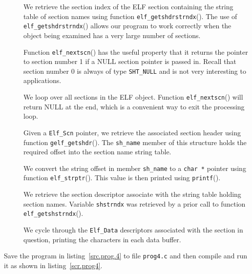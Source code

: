 \documentclass[a4paper]{book}
\makeatletter
\newcommand{\constant}[1]{\texttt{#1}}
\newcommand{\function}[1]{\texttt{#1}()}
\newcommand{\filename}[1]{\texttt{#1}}
\newcommand{\parameter}[1]{\texttt{#1}}
\newcommand{\type}[1]{\texttt{#1}}
\newenvironment{callout}[2][blue]{%
  \begingroup\newcommand{\@cocolor}{#1}%
  \newcommand{\@cogroup}[1]{#2}}{\endgroup}
\newcommand{\@co}[1]{\framebox{\textbf{\color{\@cocolor}#1}}}
\newcommand{\coref}[1]{%
  \hypertarget{\@cogroup.#1.cr}{%
    \hyperlink{\@cogroup.#1.co}{\@co{#1}}}}
\makeatother
\begin{document}
\begin{callout}{prog4}
  

  \begin{description}
    \item[\coref{1}] We retrieve the section index of the ELF section
      containing the string table of section names using function
      \function{elf\_getshdrstrndx}.  The use of
      \function{elf\_getshdrstrndx} allows our program to work
      correctly when the object being examined has a very large number
      of sections.
    \item[\coref{2}] Function \function{elf\_nextscn} has the useful
      property that it returns the pointer to section number 1 if a
      NULL section pointer is passed in.  Recall that section number 0
      is always of type \constant{SHT\_NULL} and is not very
      interesting to applications.
    \item[\coref{3}] We loop over all sections in the ELF object.
      Function \function{elf\_nextscn} will return NULL at the end,
      which is a convenient way to exit the processing loop.
    \item[\coref{4}] Given a \type{Elf\_Scn} pointer, we retrieve the
      associated section header using function
      \function{gelf\_getshdr}.  The \parameter{sh\_name} member of
      this structure holds the required offset into the section name
      string table.
    \item[\coref{5}] We convert the string offset in member
      \parameter{sh\_name} to a \type{char *} pointer using function
      \function{elf\_strptr}.  This value is then printed using
      \function{printf}.
    \item[\coref{6}] We retrieve the section descriptor associate with
      the string table holding section names.  Variable
      \parameter{shstrndx} was retrieved by a prior call to function
      \function{elf\_getshstrndx}.
    \item[\coref{7}] We cycle through the \type{Elf\_Data} descriptors
      associated with the section in question, printing the characters
      in each data buffer.
  \end{description}
\end{callout}

Save the program in listing~\vref{src.prog.4} to file
\filename{prog4.c} and then compile and run it as shown in
listing~\vref{scr.prog4}.
\end{document}
